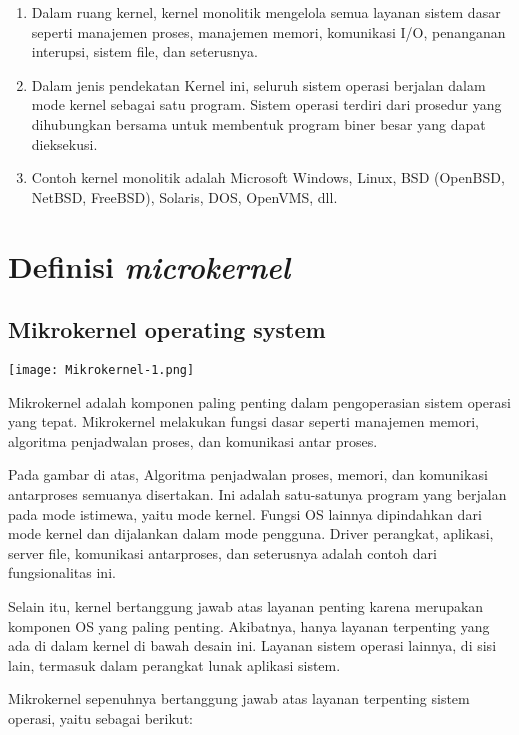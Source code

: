 \begin{enumerate}
	\item Dalam ruang kernel, kernel monolitik mengelola semua layanan sistem dasar seperti manajemen proses, manajemen memori, komunikasi I/O, penanganan interupsi, sistem file, dan seterusnya.
	
	\item Dalam jenis pendekatan Kernel ini, seluruh sistem operasi berjalan dalam mode kernel sebagai satu program. Sistem operasi terdiri dari prosedur yang dihubungkan bersama untuk membentuk program biner besar yang dapat dieksekusi.
	
	\item Contoh kernel monolitik adalah Microsoft Windows, Linux, BSD (OpenBSD, NetBSD, FreeBSD), Solaris, DOS, OpenVMS, dll.
\end{enumerate}

\vskip0.5cm


\section{Definisi \textit{microkernel}}

\subsection{Mikrokernel operating system}
\texttt{[image: Mikrokernel-1.png]}


Mikrokernel adalah komponen paling penting dalam pengoperasian sistem operasi yang tepat. Mikrokernel melakukan fungsi dasar seperti manajemen memori, algoritma penjadwalan proses, dan komunikasi antar proses.

Pada gambar di atas, Algoritma penjadwalan proses, memori, dan komunikasi antarproses semuanya disertakan. Ini adalah satu-satunya program yang berjalan pada mode istimewa, yaitu mode kernel. Fungsi OS lainnya dipindahkan dari mode kernel dan dijalankan dalam mode pengguna. Driver perangkat, aplikasi, server file, komunikasi antarproses, dan seterusnya adalah contoh dari fungsionalitas ini.

Selain itu, kernel bertanggung jawab atas layanan penting karena merupakan komponen OS yang paling penting. Akibatnya, hanya layanan terpenting yang ada di dalam kernel di bawah desain ini. Layanan sistem operasi lainnya, di sisi lain, termasuk dalam perangkat lunak aplikasi sistem.

Mikrokernel sepenuhnya bertanggung jawab atas layanan terpenting sistem operasi, yaitu sebagai berikut:

